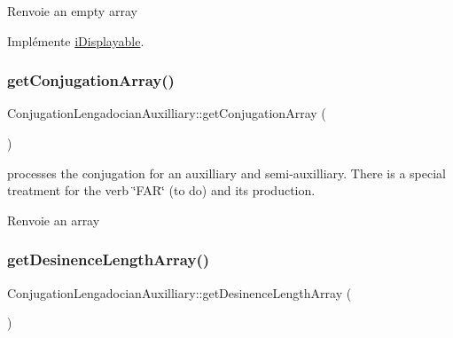 \begin{DoxyReturn}{Renvoie}
an empty array 
\end{DoxyReturn}


Implémente \hyperlink{interfacei_displayable_a0264fd455c876e897f754cf85f1681ca}{i\+Displayable}.

\hypertarget{class_conjugation_lengadocian_auxilliary_a19fa4af3fd6382641c641a6eebb9ad68}{}\label{class_conjugation_lengadocian_auxilliary_a19fa4af3fd6382641c641a6eebb9ad68} 
\subsubsection{\texorpdfstring{get\+Conjugation\+Array()}{getConjugationArray()}}
{\footnotesize\ttfamily Conjugation\+Lengadocian\+Auxilliary\+::get\+Conjugation\+Array (\begin{DoxyParamCaption}{ }\end{DoxyParamCaption})}

processes the conjugation for an auxilliary and semi-\/auxilliary. There is a special treatment for the verb \char`\"{}\+F\+A\+R\char`\"{} (to do) and its production. \begin{DoxyReturn}{Renvoie}
an array 
\end{DoxyReturn}
\hypertarget{class_conjugation_lengadocian_auxilliary_a931f205d57b485b89504d879cba60230}{}\label{class_conjugation_lengadocian_auxilliary_a931f205d57b485b89504d879cba60230} 
\subsubsection{\texorpdfstring{get\+Desinence\+Length\+Array()}{getDesinenceLengthArray()}}
{\footnotesize\ttfamily Conjugation\+Lengadocian\+Auxilliary\+::get\+Desinence\+Length\+Array (\begin{DoxyParamCaption}{ }\end{DoxyParamCaption})\hspace{0.3cm}{\ttfamily [protected]}}



